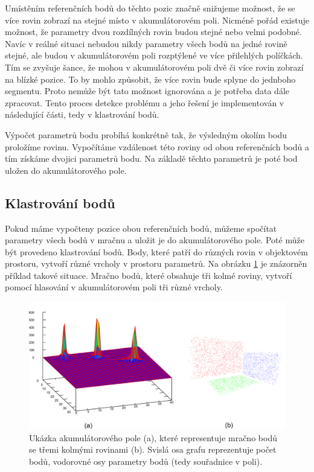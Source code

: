 \documentclass[11pt,twoside,a4paper]{book}
\begin{document}
Umístěním referenčních bodů do těchto pozic značně snižujeme možnost, že se více rovin zobrazí na stejné místo v akumulátorovém poli. Nicméně pořád existuje možnost, že parametry dvou rozdílných rovin budou stejné nebo velmi podobné. Navíc v reálné situaci nebudou nikdy parametry všech bodů na jedné rovině stejné, ale budou v akumulátorovém poli rozptýlené ve více přilehlých políčkách. Tím se zvyšuje šance, že mohou v akumulátorovém poli dvě či více rovin zobrazí na blízké pozice. To by mohlo způsobit, že více rovin bude splyne do jednboho segmentu. Proto nemůže být tato možnost ignorována a je potřeba data dále zpracovat. Tento proces detekce problému a jeho řešení je implementován v následující části, tedy v klastrování bodů.

Výpočet parametrů bodu probíhá konkrétně tak, že výsledným okolím bodu proložíme rovinu. Vypočítáme vzdálenost této roviny od obou referenčních bodů a tím získáme dvojici parametrů bodu. Na základě těchto parametrů je poté bod uložen do akumulátorového pole.

\subsection{Klastrování bodů}
\label{sub:analyza-klastrovani}

Pokud máme vypočteny pozice obou referenčních bodů, můžeme spočítat parametry všech bodů v mračnu a uložit je do akumulátorového pole. Poté může být provedeno klastrování bodů. Body, které patří do různých rovin v objektovém prostoru, vytvoří různé vrcholy v prostoru parametrů. Na obrázku \ref{fig:acc-pole} je znázorněn příklad takové situace. Mračno bodů, které obsahuje tři kolmé roviny, vytvoří pomocí hlasování v akumulátorovém poli tři různé vrcholy.

\begin{figure}[ht]
\begin{center}
\includegraphics[width=\textwidth]{figures/ac-pole}
\caption{Ukázka akumulátorového pole (a), které representuje mračno bodů se třemi kolmými rovinami (b). Svislá osa grafu reprezentuje počet bodů, vodorovné osy parametry bodů (tedy souřadnice v poli).}
\label{fig:acc-pole}
\end{center}
\end{figure}
\end{document}
